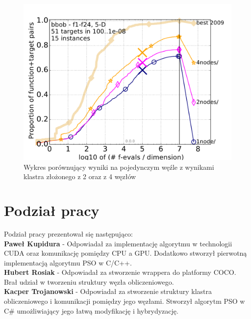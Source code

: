 \documentclass[12pt, twoside, openany, abstract=on]{report}
\theoremstyle{definition}
\begin{document}

\begin{figure}[H]
    \includegraphics[scale=1]{charts/124compare_5D.pdf} \par
 \caption{Wykres porównujący wyniki na pojedynczym węźle z wynikami klastra złożonego z 2 oraz z 4 węzłów}
\end{figure}



\chapter{Podział pracy}
Podział pracy prezentował się następująco:\\

\textbf{Paweł Kupidura} - Odpowiadał za implementację algorytmu w technologii CUDA oraz komunikację pomiędzy CPU a GPU. Dodatkowo stworzył pierwotną implementacją algorytmu PSO w C/C++.\\

\textbf{Hubert Rosiak} - Odpowiadał za stworzenie wrappera do platformy COCO. Brał udział w tworzeniu struktury węzła obliczeniowego.\\

\textbf{Kacper Trojanowski} - Odpowiadał za stworzenie struktury klastra obliczeniowego i komunikacji pomiędzy jego węzłami. Stworzył algorytm PSO w C\# umożliwiający jego łatwą modyfikację i hybrydyzację.

\end{document}
